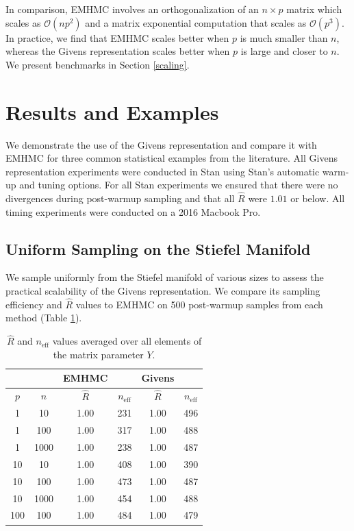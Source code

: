 \documentclass[ba]{imsart}
\numberwithin{equation}{section}
\theoremstyle{plain}
\begin{document}
\noindent In comparison, EMHMC involves an orthogonalization of an $n \times p$ matrix which scales as $\mathcal{O}(np^2)$ and a matrix exponential computation that scales as $\mathcal{O}(p^3)$. In practice, we find that EMHMC scales better when $p$ is much smaller than $n$, whereas the Givens representation scales better when $p$ is large and closer to $n$. We present benchmarks in Section \ref{scaling}.

\section{Results and Examples} \label{examples}

We demonstrate the use of the Givens representation and compare it with EMHMC for three common statistical examples from the literature. All Givens representation experiments were conducted in Stan using Stan's automatic warm-up and tuning options. For all Stan experiments we ensured that there were no divergences during post-warmup sampling and that all $\hat{R}$ were $1.01$ or below. All timing experiments were conducted on a 2016 Macbook Pro.


\subsection{Uniform Sampling on the Stiefel Manifold} \label{scaling_examples}
We sample uniformly from the Stiefel manifold of various sizes to assess the practical scalability of the Givens representation. We compare its sampling efficiency and $\hat{R}$ values to EMHMC on 500 post-warmup samples from each method (Table \ref{tab:rhat_neff}).  

\begin{table}
\begin{tabular}{|cc||cc|cc|}
\hline
& & EMHMC & & Givens &\\
\hline
$p$ & $n$  & $\hat{R}$ & $n_{\mathrm{eff}}$ & $\hat{R}$ & $n_{\mathrm{eff}}$\\
\hline
\hline
1 & 10 & 1.00 & 231 & 1.00 & 496\\
1 & 100 & 1.00 & 317 & 1.00 & 488\\
1 & 1000 & 1.00 & 238 & 1.00 & 487 \\
\hline
10 & 10 & 1.00 & 408 & 1.00  & 390\\
10 & 100 & 1.00 & 473 & 1.00 & 487\\
10 & 1000 & 1.00 & 454 & 1.00  & 488 \\
\hline
100 & 100 & 1.00 & 484 & 1.00 & 479 \\
\hline
\end{tabular}
\caption{$\hat{R}$ and $n_{\mathrm{eff}}$ values averaged over all elements of the matrix parameter $Y$. }
\label{tab:rhat_neff}
\end{table}
\end{document}
